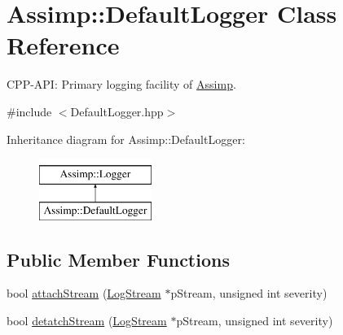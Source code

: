 \hypertarget{classAssimp_1_1DefaultLogger}{\section{\-Assimp\-:\-:\-Default\-Logger \-Class \-Reference}
\label{classAssimp_1_1DefaultLogger}
}


\-C\-P\-P-\/\-A\-P\-I\-: \-Primary logging facility of \hyperlink{namespaceAssimp}{\-Assimp}.  




{\ttfamily \#include $<$\-Default\-Logger.\-hpp$>$}

\-Inheritance diagram for \-Assimp\-:\-:\-Default\-Logger\-:\begin{figure}[H]
\begin{center}
\leavevmode
\includegraphics[height=2.000000cm]{classAssimp_1_1DefaultLogger}
\end{center}
\end{figure}
\subsection*{\-Public \-Member \-Functions}
\begin{DoxyCompactItemize}
\item 
bool \hyperlink{classAssimp_1_1DefaultLogger_abc0ca7a337f8c3e38eca0eb45bb1ccf0}{attach\-Stream} (\hyperlink{classAssimp_1_1LogStream}{\-Log\-Stream} $\ast$p\-Stream, unsigned int severity)
\item 
bool \hyperlink{classAssimp_1_1DefaultLogger_a2615f1d1624f1d742d0cf2dd4a5cccc8}{detatch\-Stream} (\hyperlink{classAssimp_1_1LogStream}{\-Log\-Stream} $\ast$p\-Stream, unsigned int severity)
\end{DoxyCompactItemize}
